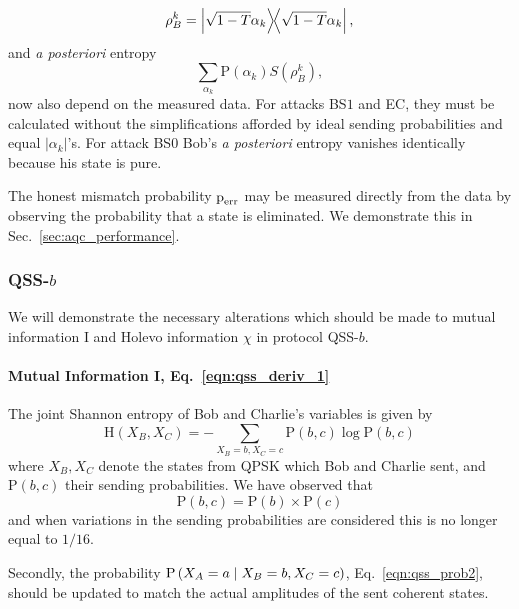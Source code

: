 \begin{equation}
\rho_B^k = \dyad{\sqrt{1-T}\alpha_k},
\end{equation} 
and \emph{a posteriori} entropy
\begin{equation}
\sum_{\alpha_k}\text{P}\left(\alpha_k\right) S\left(\rho_B^k\right),
\end{equation}
now also depend on the measured data. For attacks BS$1$ and EC, they must be calculated without the simplifications afforded by ideal sending probabilities and equal $\left|\alpha_k\right|$'s. For attack BS$0$ Bob's \emph{a posteriori} entropy vanishes identically because his state is pure.

The honest mismatch probability $\text{p}_{\text{err}}$ may be measured directly from the data by observing the probability that a state is eliminated. We demonstrate this in Sec.~\ref{sec:aqc_performance}.


\subsubsection{QSS-$b$}
We will demonstrate the necessary alterations which should be made to mutual information I and Holevo information $\chi$ in protocol QSS-$b$.

\paragraph{Mutual Information I, Eq.~\ref{eqn:qss_deriv_1}}
The joint Shannon entropy of Bob and Charlie's variables is given by
\begin{equation}
\text{H}\left(X_B, X_C\right) = - \sum_{X_B=b, X_C=c} \text{P}\left(b, c\right) \log \text{P}\left(b, c\right)
\end{equation}
where $X_B, X_C$ denote the states from QPSK which Bob and Charlie sent, and $\text{P}\left(b, c\right)$ their sending probabilities. We have observed that
\begin{equation}
\text{P}\left(b, c\right) = \text{P}\left(b\right) \times \text{P}\left(c\right)
\end{equation}
and when variations in the sending probabilities are considered this is no longer equal to $1/16$. 

Secondly, the probability $\text{P}\left(X_A=a \; \middle| \; X_B=b, X_C=c\right)$, Eq.~\ref{eqn:qss_prob2}, should be updated to match the actual amplitudes of the sent coherent states.

